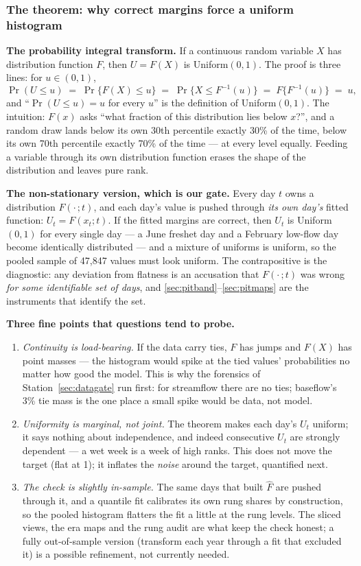 \documentclass[11pt]{article}
\begin{document}
\subsubsection{The theorem: why correct margins force a uniform histogram}
\label{sec:pitthm}

\textbf{The probability integral transform.} If a continuous random variable
$X$ has distribution function $F$, then $U = F(X)$ is Uniform$(0,1)$. The
proof is three lines: for $u \in (0,1)$,
\[
\Pr(U \le u) \;=\; \Pr\{F(X) \le u\} \;=\; \Pr\{X \le F^{-1}(u)\}
\;=\; F\{F^{-1}(u)\} \;=\; u,
\]
and ``$\Pr(U \le u) = u$ for every $u$'' is the definition of Uniform$(0,1)$.
The intuition: $F(x)$ asks ``what fraction of this distribution lies below
$x$?'', and a random draw lands below its own 30th percentile exactly 30\% of
the time, below its own 70th percentile exactly 70\% of the time --- at every
level equally. Feeding a variable through its own distribution function
erases the shape of the distribution and leaves pure rank.

\textbf{The non-stationary version, which is our gate.} Every day $t$ owns a
distribution $F(\cdot\,;t)$, and each day's value is pushed through \emph{its
own day's} fitted function: $U_t = F(x_t;t)$. If the fitted margins are
correct, then $U_t$ is Uniform$(0,1)$ for every single day --- a June freshet
day and a February low-flow day become identically distributed --- and a
mixture of uniforms is uniform, so the pooled sample of 47{,}847 values must
look uniform. The contrapositive is the diagnostic: any deviation from
flatness is an accusation that $F(\cdot\,;t)$ was wrong \emph{for some
identifiable set of days}, and \ref{sec:pitband}--\ref{sec:pitmaps} are the
instruments that identify the set.

\textbf{Three fine points that questions tend to probe.}
\begin{enumerate}
\item \emph{Continuity is load-bearing.} If the data carry ties, $F$ has
jumps and $F(X)$ has point masses --- the histogram would spike at the tied
values' probabilities no matter how good the model. This is why the forensics
of Station~\ref{sec:datagate} run first: for streamflow there are no ties;
baseflow's 3\% tie mass is the one place a small spike would be data, not
model.
\item \emph{Uniformity is marginal, not joint.} The theorem makes each day's
$U_t$ uniform; it says nothing about independence, and indeed consecutive
$U_t$ are strongly dependent --- a wet week is a week of high ranks. This
does not move the target (flat at 1); it inflates the \emph{noise} around
the target, quantified next.
\item \emph{The check is slightly in-sample.} The same days that built
$\hat F$ are pushed through it, and a quantile fit calibrates its own rung
shares by construction, so the pooled histogram flatters the fit a little at
the rung levels. The sliced views, the era maps and the rung audit are what
keep the check honest; a fully out-of-sample version (transform each year
through a fit that excluded it) is a possible refinement, not currently
needed.
\end{enumerate}
\end{document}
